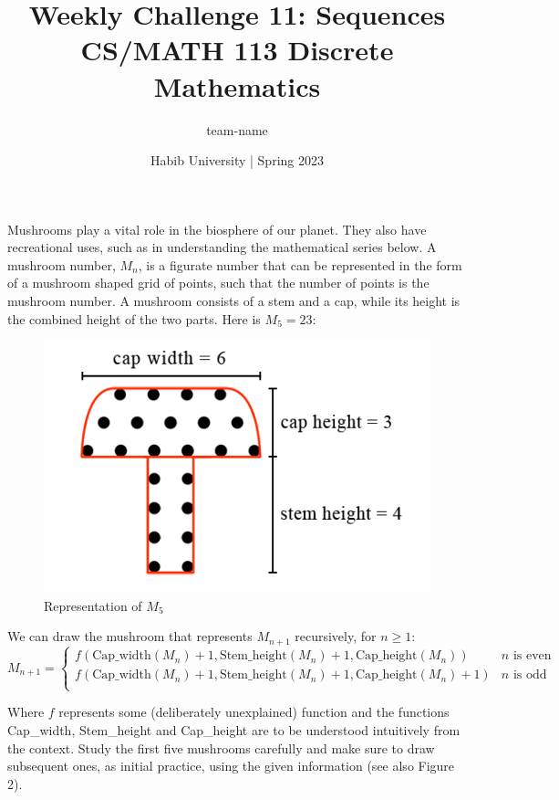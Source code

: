 \documentclass[a4paper]{exam}
\title{Weekly Challenge 11: Sequences\\CS/MATH 113 Discrete Mathematics}
\author{team-name}  %
\date{Habib University | Spring 2023}
\begin{document}
\maketitle

\begin{questions}


 Mushrooms play a vital role in the biosphere of our planet. They also have recreational uses, such as in understanding the mathematical series below. A mushroom number, $M_n$, is a figurate number that can be represented in the form of a mushroom shaped grid of points, such that the number of points is the mushroom number. A mushroom consists of a stem and a cap, while its height is the combined height of the two parts. Here is $M_5=23$:
 
 \begin{figure}[h]
 	\centering
 	\includegraphics[scale=1.0]{m5_figurate.png}
 	\caption{Representation of $M_5$}
 	\label{fig:mushroom_anatomy}
 \end{figure}
 
 We can draw the mushroom that represents $M_{n+1}$ recursively, for $n \geq 1$:
 \[ 
 M_{n+1}=
 \begin{cases} 
 f(\textrm{Cap\_width}(M_n) + 1, \textrm{Stem\_height}(M_n) + 1, \textrm{Cap\_height}(M_n))  & n \textrm{ is even} \\
 f(\textrm{Cap\_width}(M_n) + 1, \textrm{Stem\_height}(M_n) + 1, \textrm{Cap\_height}(M_n)+1) & n \textrm{ is odd}  \\      
 \end{cases}
 \]
 
 Where $f$ represents some (deliberately unexplained) function and the functions Cap\_width, Stem\_height and Cap\_height are to be understood intuitively from the context. Study the first five mushrooms carefully and make sure to draw subsequent ones, as initial practice, using the given information (see also Figure 2).
 

\end{questions}
\end{document}
